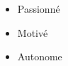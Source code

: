 %
%
%
\twocolumnsection
{
  \sloppy
  \begin{skills}
  \end{skills}}
{
  \vspace{1em}
  \begin{itemize}
    \item Passionné
    \item Motivé                    
    \item Autonome
  \end{itemize}}
\vspace{0.8em}